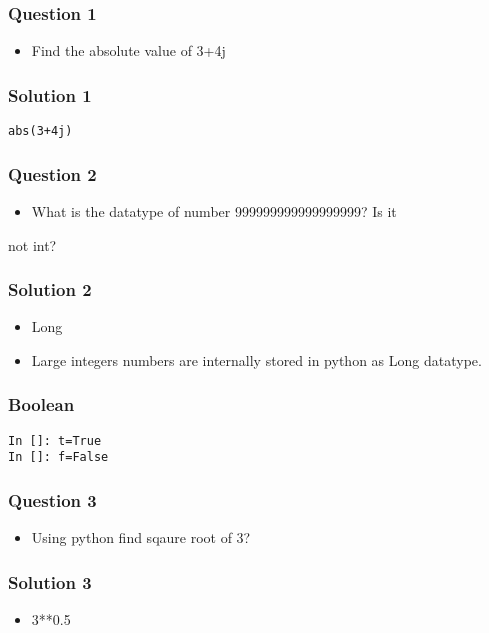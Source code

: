 \documentclass[presentation]{beamer}
\begin{document}
\begin{frame}
\frametitle{Question 1}
\label{sec-3}

\begin{itemize}
\item Find the absolute value of 3+4j
\end{itemize}
\end{frame}
\begin{frame}[fragile]
\frametitle{Solution 1}
\label{sec-4}

\lstset{language=Python}
\begin{lstlisting}
abs(3+4j)
\end{lstlisting}
\end{frame}
\begin{frame}
\frametitle{Question 2}
\label{sec-5}

\begin{itemize}
\item What is the datatype of number 999999999999999999? Is it
\end{itemize}

not int?
\end{frame}
\begin{frame}
\frametitle{Solution 2}
\label{sec-6}


\begin{itemize}
\item Long
\item Large integers numbers are internally stored in python as Long
    datatype.
\end{itemize}
\end{frame}
\begin{frame}[fragile]
\frametitle{Boolean}
\label{sec-7}

\lstset{language=Python}
\begin{lstlisting}
In []: t=True
In []: f=False
\end{lstlisting}
\end{frame}
\begin{frame}
\frametitle{Question 3}
\label{sec-8}

\begin{itemize}
\item Using python find sqaure root of 3?
\end{itemize}
\end{frame}
\begin{frame}
\frametitle{Solution 3}
\label{sec-9}


\begin{itemize}
\item 3**0.5
\end{itemize}
\end{frame}
\end{document}

